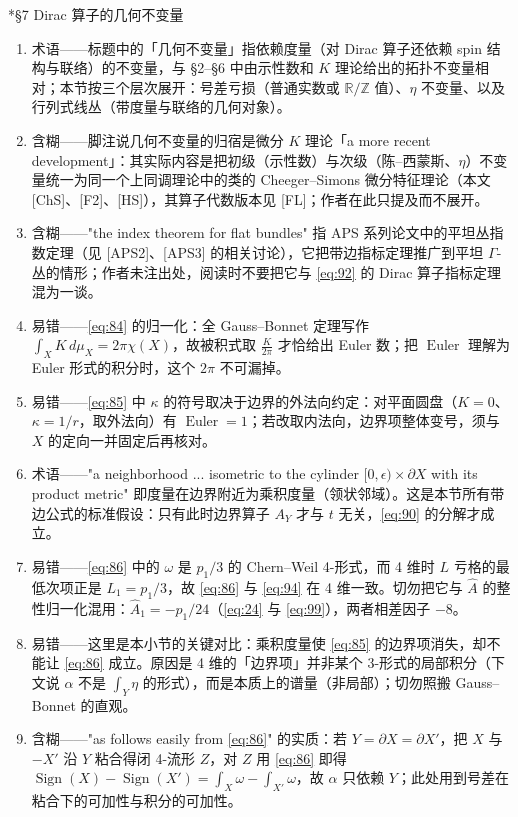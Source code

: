 \documentclass[11pt]{amsart}
\makeatletter
\def\subsection{\@startsection{subsection}{2}%
   \z@{1.25\linespacing\@plus.7\linespacing}{.5\linespacing}%
   {\normalfont\bfseries}}
\theoremstyle{definition}
\theoremstyle{remark}
\theoremstyle{plain}
\numberwithin{equation}{section}
\renewcommand{\:}{\colon}
\newcommand{\Ahat}{{\hat A}}
\newcommand{\RR}{{\mathbb R}}
\newcommand{\ZZ}{{\mathbb Z}}
\DeclareMathOperator{\Euler}{Euler}
\DeclareMathOperator{\Sign}{Sign}
\newcommand{\RZ}{\RR/\ZZ}
\newcommand{\bX}{\partial X}
\makeatother
\begin{document}
\subsection*{§7 Dirac 算子的几何不变量}
\begin{enumerate}[leftmargin=2.2em,itemsep=2pt,topsep=2pt]
  \item 术语——标题中的「几何不变量」指依赖度量（对 Dirac 算子还依赖 spin 结构与联络）的不变量，与 §2–§6 中由示性数和 $K$ 理论给出的拓扑不变量相对；本节按三个层次展开：号差亏损（普通实数或 $\RZ$ 值）、$\eta$ 不变量、以及行列式线丛（带度量与联络的几何对象）。
  \item 含糊——脚注说几何不变量的归宿是微分 $K$ 理论「a more recent development」：其实际内容是把初级（示性数）与次级（陈–西蒙斯、$\eta$）不变量统一为同一个上同调理论中的类的 Cheeger–Simons 微分特征理论（本文 [ChS]、[F2]、[HS]），其算子代数版本见 [FL]；作者在此只提及而不展开。
  \item 含糊——"the index theorem for flat bundles" 指 APS 系列论文中的平坦丛指数定理（见 [APS2]、[APS3] 的相关讨论），它把带边指标定理推广到平坦 $\Gamma$-丛的情形；作者未注出处，阅读时不要把它与 \eqref{eq:92} 的 Dirac 算子指标定理混为一谈。
  \item 易错——\eqref{eq:84} 的归一化：全 Gauss–Bonnet 定理写作 $\int_X K\,d\mu_X=2\pi\chi(X)$，故被积式取 $\frac{K}{2\pi}$ 才恰给出 Euler 数；把 $\Euler$ 理解为 Euler 形式的积分时，这个 $2\pi$ 不可漏掉。
  \item 易错——\eqref{eq:85} 中 $\kappa$ 的符号取决于边界的外法向约定：对平面圆盘（$K=0$、$\kappa=1/r$，取外法向）有 $\Euler=1$；若改取内法向，边界项整体变号，须与 $X$ 的定向一并固定后再核对。
  \item 术语——"a neighborhood ... isometric to the cylinder $[0,\epsilon )\times \bX$ with its product metric" 即度量在边界附近为乘积度量（领状邻域）。这是本节所有带边公式的标准假设：只有此时边界算子 $A_Y$ 才与 $t$ 无关，\eqref{eq:90} 的分解才成立。
  \item 易错——\eqref{eq:86} 中的 $\omega$ 是 $p_1/3$ 的 Chern–Weil 4-形式，而 4 维时 $L$ 亏格的最低次项正是 $L_1=p_1/3$，故 \eqref{eq:86} 与 \eqref{eq:94} 在 4 维一致。切勿把它与 $\Ahat$ 的整性归一化混用：$\hat A_1=-p_1/24$（\eqref{eq:24} 与 \eqref{eq:99}），两者相差因子 $-8$。
  \item 易错——这里是本小节的关键对比：乘积度量使 \eqref{eq:85} 的边界项消失，却不能让 \eqref{eq:86} 成立。原因是 4 维的「边界项」并非某个 3-形式的局部积分（下文说 $\alpha$ 不是 $\int_Y\eta$ 的形式），而是本质上的谱量（非局部）；切勿照搬 Gauss–Bonnet 的直观。
  \item 含糊——"as follows easily from \eqref{eq:86}" 的实质：若 $Y=\bX=\bX'$，把 $X$ 与 $-X'$ 沿 $Y$ 粘合得闭 4-流形 $Z$，对 $Z$ 用 \eqref{eq:86} 即得 $\Sign(X)-\Sign(X')=\int_X\omega-\int_{X'}\omega$，故 $\alpha$ 只依赖 $Y$；此处用到号差在粘合下的可加性与积分的可加性。

\end{enumerate}
\end{document}

